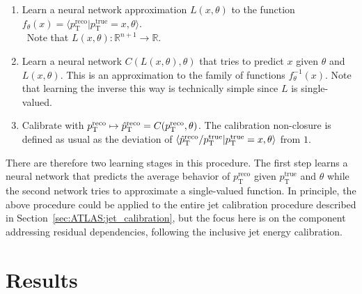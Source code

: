 \begin{enumerate}
  \item Learn a neural network approximation $L(x,\theta)$ to the function $f_\theta(x)=\langle p_\text{T}^\text{reco}|p_\text{T}^\text{true}=x,\theta\rangle$.  \\\ Note that $L(x,\theta):\mathbb{R}^{n+1}\rightarrow\mathbb{R}$.
\item Learn a neural network $C(L(x,\theta),\theta)$ that tries to predict $x$ given $\theta$ and $L(x,\theta)$.  This is an approximation to the family of functions $f^{-1}_\theta(x)$.  Note that learning the inverse this way is technically simple since $L$ is single-valued.
\item Calibrate with $p_\text{T}^\text{reco} \mapsto \hat{p}_\text{T}^\text{reco} = C(p_\text{T}^\text{reco},\theta)$.  The calibration non-closure is defined as usual as the deviation of $\langle \hat{p}_\text{T}^\text{reco}/p_\text{T}^\text{true} | p_\text{T}^\text{true}=x,\theta\rangle$ from $1$.
\end{enumerate}

There are therefore two learning stages in this procedure.
The first step learns a neural network that predicts the average behavior of $p_\text{T}^\text{reco}$ given $p_\text{T}^\text{true}$ and $\theta$ while the second network tries to approximate a single-valued function.
In principle, the above procedure could be applied to the entire jet calibration procedure described in Section~\ref{sec:ATLAS:jet_calibration}, but the focus here is on the component addressing residual dependencies, following the inclusive jet energy calibration.

\section{Results}
\label{sec:GenNI:results}

